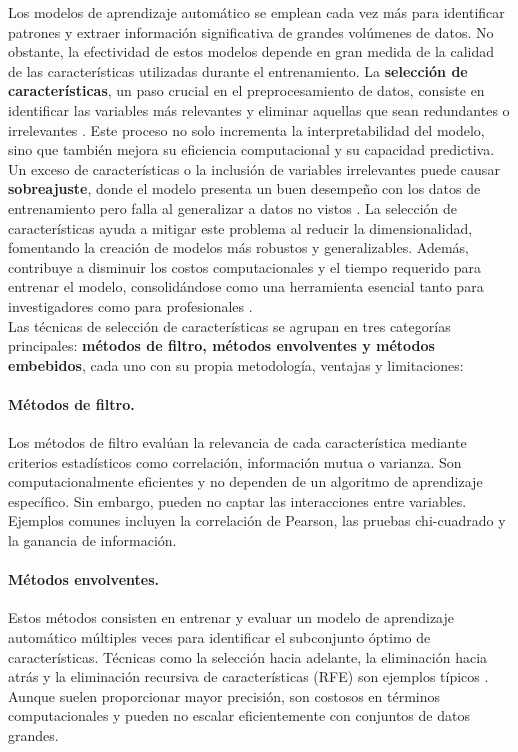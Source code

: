 Los modelos de aprendizaje automático se emplean cada vez más para identificar patrones y extraer información significativa de grandes volúmenes de datos. No obstante, la efectividad de estos modelos depende en gran medida de la calidad de las características utilizadas durante el entrenamiento. La \textbf{selección de características}, un paso crucial en el preprocesamiento de datos, consiste en identificar las variables más relevantes y eliminar aquellas que sean redundantes o irrelevantes \cite{liu2023, Huang2024}. Este proceso no solo incrementa la interpretabilidad del modelo, sino que también mejora su eficiencia computacional y su capacidad predictiva. Un exceso de características o la inclusión de variables irrelevantes puede causar \textbf{sobreajuste}, donde el modelo presenta un buen desempeño con los datos de entrenamiento pero falla al generalizar a datos no vistos \cite{che2024a}. La selección de características ayuda a mitigar este problema al reducir la dimensionalidad, fomentando la creación de modelos más robustos y generalizables. Además, contribuye a disminuir los costos computacionales y el tiempo requerido para entrenar el modelo, consolidándose como una herramienta esencial tanto para investigadores como para profesionales \cite{Cheng2024}.\\

Las técnicas de selección de características se agrupan en tres categorías principales: \textbf{métodos de filtro, métodos envolventes y métodos embebidos}, cada uno con su propia metodología, ventajas y limitaciones:  

\paragraph{Métodos de filtro.} Los métodos de filtro evalúan la relevancia de cada característica mediante criterios estadísticos como correlación, información mutua o varianza. Son computacionalmente eficientes y no dependen de un algoritmo de aprendizaje específico. Sin embargo, pueden no captar las interacciones entre variables. Ejemplos comunes incluyen la correlación de Pearson, las pruebas chi-cuadrado y la ganancia de información.  

\paragraph{Métodos envolventes.} Estos métodos consisten en entrenar y evaluar un modelo de aprendizaje automático múltiples veces para identificar el subconjunto óptimo de características. Técnicas como la selección hacia adelante, la eliminación hacia atrás y la eliminación recursiva de características (RFE) son ejemplos típicos \cite{Che2024b,liu2024}. Aunque suelen proporcionar mayor precisión, son costosos en términos computacionales y pueden no escalar eficientemente con conjuntos de datos grandes.  

